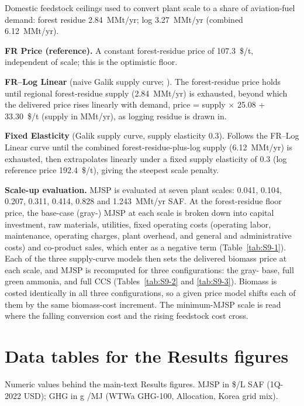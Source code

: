 \documentclass[11pt]{article}
\begin{document}
Domestic feedstock ceilings used to convert plant scale to a share of aviation-fuel demand: forest residue 2.84~MMt/yr; log 3.27~MMt/yr (combined 6.12~MMt/yr).

\textbf{FR Price (reference).} A constant forest-residue price of 107.3~\$/t, independent of scale; this is the optimistic floor.

\textbf{FR--Log Linear} (naive Galik supply curve; \citep{galik2009forest}). The forest-residue price holds until regional forest-residue supply (2.84~MMt/yr) is exhausted, beyond which the delivered price rises linearly with demand, price = supply $\times$ 25.08 + 33.30~\$/t (supply in MMt/yr), as logging residue is drawn in.

\textbf{Fixed Elasticity} (Galik supply curve, supply elasticity 0.3). Follows the FR--Log Linear curve until the combined forest-residue-plus-log supply (6.12~MMt/yr) is exhausted, then extrapolates linearly under a fixed supply elasticity of 0.3 (log reference price 192.4~\$/t), giving the steepest scale penalty.

\textbf{Scale-up evaluation.} MJSP is evaluated at seven plant scales: 0.041, 0.104, 0.207, 0.311, 0.414, 0.828 and 1.243~MMt/yr SAF. At the forest-residue floor price, the base-case (gray-) MJSP at each scale is broken down into capital investment, raw materials, utilities, fixed operating costs (operating labor, maintenance, operating charges, plant overhead, and general and administrative costs) and co-product sales, which enter as a negative term (Table~\ref{tab:S9-1}). Each of the three supply-curve models then sets the delivered biomass price at each scale, and MJSP is recomputed for three configurations: the gray- base, full green ammonia, and full CCS (Tables~\ref{tab:S9-2} and \ref{tab:S9-3}). Biomass is costed identically in all three configurations, so a given price model shifts each of them by the same biomass-cost increment. The minimum-MJSP scale is read where the falling conversion cost and the rising feedstock cost cross.
\section{Data tables for the Results figures}\label{sec:S9}

Numeric values behind the main-text Results figures.
MJSP in \$/L SAF (1Q-2022 USD); GHG in g \COtwoe/MJ (WTWa GHG-100, Allocation, Korea grid mix).
\end{document}
